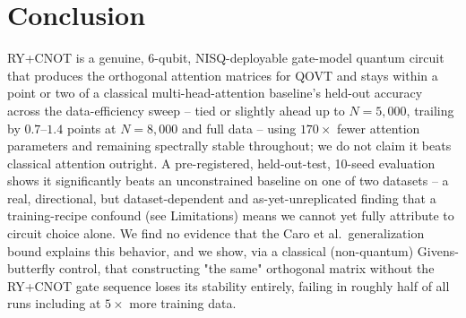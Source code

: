 \documentclass[10pt,letterpaper]{article}
\theoremstyle{plain}
\theoremstyle{definition}
\begin{document}
\section{Conclusion}
\label{sec:concl}

RY+CNOT is a genuine, 6-qubit, NISQ-deployable gate-model quantum circuit
that produces the orthogonal attention matrices for QOVT and stays within
a point or two of a classical multi-head-attention baseline's held-out
accuracy across the data-efficiency sweep -- tied or slightly ahead up to
$N{=}5{,}000$, trailing by $0.7$--$1.4$ points at $N{=}8{,}000$ and full
data -- using $170\times$ fewer attention parameters and remaining
spectrally stable throughout; we do not claim it beats classical
attention outright. A pre-registered, held-out-test, 10-seed evaluation
shows it significantly beats an unconstrained baseline on one of two
datasets -- a real, directional, but dataset-dependent and
as-yet-unreplicated finding that a training-recipe confound (see
Limitations) means we cannot yet fully attribute to circuit choice alone.
We find no evidence that the Caro et al.\
generalization bound explains this behavior, and we show, via a classical
(non-quantum) Givens-butterfly control, that constructing "the same"
orthogonal matrix without the RY+CNOT gate sequence loses its stability
entirely, failing in roughly half of all runs including at $5\times$ more
training data.
\end{document}
